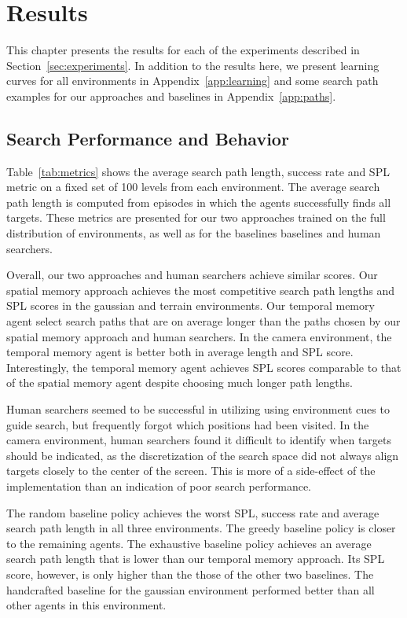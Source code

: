 \chapter{Results}
\label{cha:results}

This chapter presents the results for each of the experiments described in Section~\ref{sec:experiments}.
In addition to the results here, we present learning curves for all environments in Appendix~\ref{app:learning} and some search path examples for our approaches and baselines in Appendix~\ref{app:paths}.


\section{Search Performance and Behavior}

Table~\ref{tab:metrics} shows the average search path length, success rate and SPL metric on a fixed set of 100 levels from each environment.
The average search path length is computed from episodes in which the agents successfully finds all targets.
These metrics are presented for our two approaches trained on the full distribution of environments, as well as for the baselines baselines and human searchers.

Overall, our two approaches and human searchers achieve similar scores.
Our spatial memory approach achieves the most competitive search path lengths and SPL scores in the gaussian and terrain environments.
Our temporal memory agent select search paths that are on average longer than the paths chosen by our spatial memory approach and human searchers.
In the camera environment, the temporal memory agent is better both in average length and SPL score.
Interestingly, the temporal memory agent achieves SPL scores comparable to that of the spatial memory agent despite choosing much longer path lengths.

Human searchers seemed to be successful in utilizing using environment cues to guide search, but frequently forgot which positions had been visited.
In the camera environment, human searchers found it difficult to identify when targets should be indicated,
as the discretization of the search space did not always align targets closely to the center of the screen.
This is more of a side-effect of the implementation than an indication of poor search performance.

The random baseline policy achieves the worst SPL, success rate and average search path length in all three environments.
The greedy baseline policy is closer to the remaining agents.
The exhaustive baseline policy achieves an average search path length that is lower than our temporal memory approach.
Its SPL score, however, is only higher than the those of the other two baselines.
The handcrafted baseline for the gaussian environment performed better than all other agents in this environment. %


